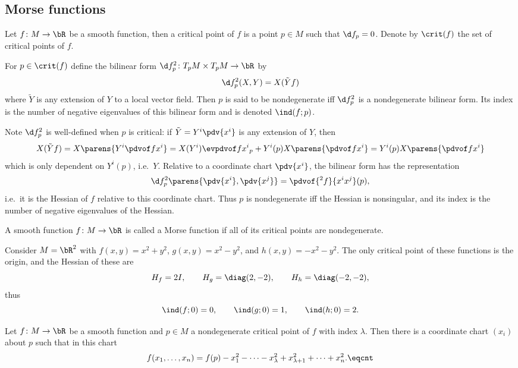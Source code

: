 \subsection{Morse functions}

\bdefn

    Let $f\colon M\to\bR$ be a smooth function, then a {\emphcolor critical point} of $f$ is a point
    $p\in M$ such that $\d f_p=0$.
    Denote by $\crit(f)$ the set of critical points of $f$.

    For $p\in\crit(f)$ define the bilinear form $\d f_p^2\colon T_pM\times T_pM\to\bR$ by
    $$ \d f_p^2(X,Y) = X(\tilde Yf) $$
    where $\tilde Y$ is any extension of $Y$ to a local vector field.
    Then $p$ is said to be {\emphcolor nondegenerate} iff $\d f_p^2$ is a nondegenerate bilinear form.
    Its {\emphcolor index} is the number of negative eigenvalues of this bilinear form and is denoted
    $\ind(f;p)$.

\edefn

Note $\d f_p^2$ is well-defined when $p$ is critical: if $\tilde Y=Y^i\pdv{x^i}$ is any extension of $Y$, then
$$ X(\tilde Yf) = X\parens{Y^i\pdvof f{x^i}} = X(Y^i)\evpdvof f{x^i}_p + Y^i(p)X\parens{\pdvof f{x^i}}
= Y^i(p)X\parens{\pdvof f{x^i}} $$
which is only dependent on $Y^i(p)$, i.e.\ $Y$.
Relative to a coordinate chart $\pdv{x^i}$, the bilinear form has the representation
$$ \d f_p^2\parens{\pdv{x^i},\pdv{x^j}} = \pdvof{^2f}{x^ix^j}(p) , $$
i.e.\ it is the Hessian of $f$ relative to this coordinate chart.
Thus $p$ is nondegenerate iff the Hessian is nonsingular, and its index is the number of negative eigenvalues
of the Hessian.

\bdefn

    A smooth function $f\colon M\to\bR$ is called a {\emphcolor Morse function} if all of its critical
    points are nondegenerate.

\edefn

\bexam

    Consider $M=\bR^2$ with $f(x,y)=x^2+y^2$, $g(x,y)=x^2-y^2$, and $h(x,y)=-x^2-y^2$.
    The only critical point of these functions is the origin, and the Hessian of these are
    $$ H_f = 2I,\qquad H_g = \diag(2,-2),\qquad H_h = \diag(-2,-2) , $$
    thus
    $$ \ind(f;0) = 0,\qquad \ind(g;0) = 1,\qquad \ind(h;0) = 2 . $$

\eexam

\bthrm[title={Morse Lemma}]

    Let $f\colon M\to\bR$ be a smooth function and $p\in M$ a nondegenerate critical point of $f$ with
    index $\lambda$.
    Then there is a coordinate chart $(x_i)$ about $p$ such that in this chart
    $$ f(x_1,\dots,x_n) = f(p) - x_1^2 - \cdots - x_\lambda^2 + x_{\lambda+1}^2 + \cdots + x_n^2 . 
    \eqcnt $$

